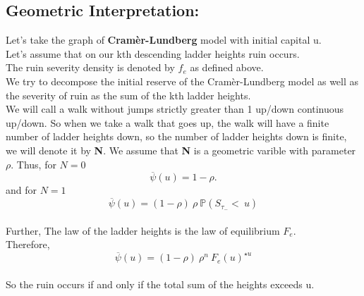 \subsection{Geometric Interpretation:}
Let's take the graph of \textbf{Cramèr-Lundberg} model with initial capital u.\\
Let's assume that on our kth descending ladder heights ruin occurs. \\  The ruin severity density is denoted by $f_{e}$ as defined above. \\
We try to decompose the initial reserve of the Cramèr-Lundberg model as well as the severity of ruin as the sum of the kth ladder heights. \\
We will call a walk without jumps strictly greater than 1 up/down continuous up/down. So when we take a walk that goes up, the walk will have a finite number of ladder heights down, so the number of ladder heights down is finite, we will denote it by \textbf{N}. We assume that \textbf{N} is a geometric varible with parameter $\rho$.
\newpage
Thus, for $N=0$
\begin{equation*}
\overline{\psi}(u)= 1- \rho.
\end{equation*}
 and for $N=1$
 \begin{equation*}
 \overline{\psi}(u)= (1-\rho) \ \rho \ \mathbb{P}( S_{\tau_{-}}< \ u)
 \end{equation*} \\
 Further, The law of the ladder heights is the law of equilibrium $ F_{e}$. \\
 Therefore, \\
 \begin{equation*}
 \overline{\psi}(u) = (1-\rho) \ \rho^{n} \ F_{e}(u)^{\star u}
 \end{equation*} \\
 So the ruin occurs if and only if the total sum of the heights exceeds u.
 